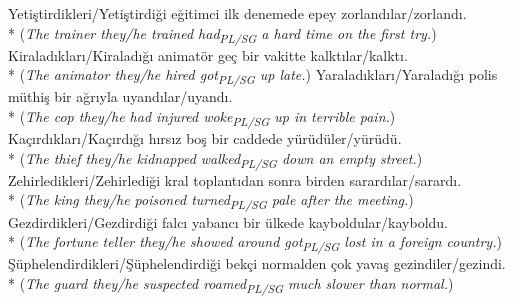 \ex Yeti\c{s}tirdikleri/Yeti\c{s}tirdi\u{g}i e\u{g}itimci ilk denemede epey zorland{\i}lar/zorland{\i}.\\*
({\it The trainer they/he trained had\textsubscript{PL/SG} a hard time on the first try.})
\ex Kiralad{\i}klar{\i}/Kiralad{\i}\u{g}{\i} animat\"{o}r ge\c{c} bir vakitte kalkt{\i}lar/kalkt{\i}.\\*
({\it The animator they/he hired got\textsubscript{PL/SG} up late.})
\ex Yaralad{\i}klar{\i}/Yaralad{\i}\u{g}{\i} polis m\"{u}thi\c{s} bir a\u{g}r{\i}yla uyand{\i}lar/uyand{\i}.\\*
({\it The cop they/he had injured woke\textsubscript{PL/SG} up in terrible pain.})
\ex Ka\c{c}{\i}rd{\i}klar{\i}/Ka\c{c}{\i}rd{\i}\u{g}{\i} h{\i}rs{\i}z bo\c{s} bir caddede y\"{u}r\"{u}d\"{u}ler/y\"{u}r\"{u}d\"{u}.\\*
({\it The thief they/he kidnapped walked\textsubscript{PL/SG} down an empty street.})
\ex Zehirledikleri/Zehirledi\u{g}i kral toplant{\i}dan sonra birden sarard{\i}lar/sarard{\i}.\\*
({\it The king they/he poisoned turned\textsubscript{PL/SG} pale after the meeting.})
\ex Gezdirdikleri/Gezdirdi\u{g}i falc{\i} yabanc{\i} bir \"{u}lkede kayboldular/kayboldu.\\*
({\it The fortune teller they/he showed around got\textsubscript{PL/SG} lost in a foreign country.})
\ex \c{S}\"{u}phelendirdikleri/\c{S}\"{u}phelendirdi\u{g}i bek\c{c}i normalden \c{c}ok yava\c{s} gezindiler/gezindi.\\*
({\it The guard they/he suspected roamed\textsubscript{PL/SG} much slower than normal.})
\z

